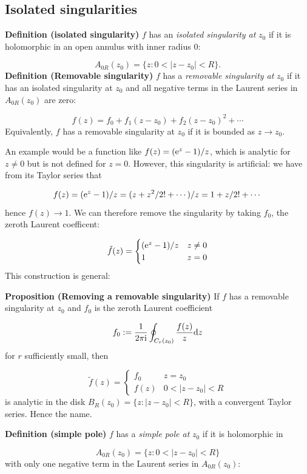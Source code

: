 \documentclass[12pt,a4paper]{article}
\def\D{ {\rm d} }
\def\I{ {\rm i} }
\def\E{ {\rm e} }
\begin{document}
\subsection{Isolated singularities}
\textbf{Definition (isolated singularity)} $f$ has an  \emph{isolated singularity at} $z_0$ if it is holomorphic in an open annulus with inner radius 0: 

\[
A_{0R}(z_0) = \{z : 0 < |z - z_0| < R \}.
\]
\textbf{Definition (Removable singularity)} $f$ has a \emph{removable singularity at} $z_0$ if it has an isolated singularity at $z_0$ and all negative terms in the Laurent series in $A_{0R}(z_0)$ are zero:

\[
f(z) = f_0 + f_1 (z-z_0) + f_2 (z-z_0)^2 + \cdots
\]
Equivalently, $f$ has a removable singularity at $z_0$ if it is bounded as $z \rightarrow z_0$. 

An example would be a function like $f(z) = (\E^z - 1) / z$, which is analytic for $z \neq 0$ but is  not defined for $z = 0$. However, this singularity is artificial: we have from its Taylor series that 

\[
f(z) = (\E^{z} - 1)/z = (z + z^2 / 2! + \cdots)/z = 1 + z/2! + \cdots
\]
hence $f(z) \rightarrow 1$. We can therefore remove the singularity by taking $f_0$, the zeroth Laurent coefficent:

\[
\tilde f(z) = \begin{cases}
    (\E^z - 1)/ z & z \neq 0 \\
    1 & z = 0
    \end{cases}
\]
This construction is general:

\textbf{Proposition (Removing a removable singularity)} If  $f$ has a removable singularity at $z_0$ and $f_0$ is the zeroth Laurent coefficient

\[
    f_0 := {1 \over 2 \pi \I} \oint_{C_r(z_0)} {f(z) \over z} \D z
\]
for $r$ sufficiently small, then

\[
\tilde f(z) = \begin{cases} f_0 & z = z_0 \\
                                f(z) & 0 < |z-z_0| < R
                                \end{cases}
\]
is analytic in the disk $B_R(z_0) = \{ z : |z-z_0| < R \}$, with a convergent Taylor series. Hence the name.

\textbf{Definition (simple pole)} $f$ has a  \emph{simple pole at} $z_0$ if it is holomorphic in 

\[
  A_{0R}(z_0) = \{z : 0 < |z - z_0| < R \}
\]
with only one negative term in the Laurent series in $A_{0R}(z_0)$:
\end{document}
